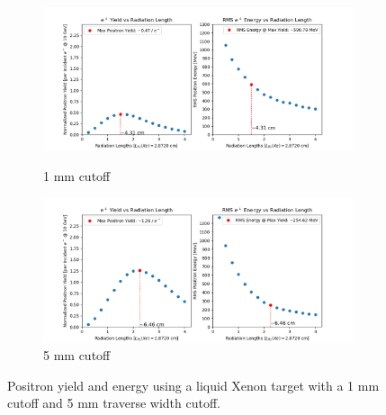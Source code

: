 \documentclass[%
reprint,
amsmath, amssymb,
aps,
floatfix,
]{revtex4-2}
\begin{document}
\begin{figure}[H]
    \begin{subfigure}{.5\textwidth}
        \includegraphics[height = .5\linewidth]{../images/XeYield1mmCutoff.png}
        \caption{\label{fig:XeY1}1 mm cutoff}
        \includegraphics[height = .5\linewidth]{../images/XeYield5mmCutoff.png}
        \caption{\label{fig:XeY5}5 mm cutoff}
    \end{subfigure}
    \caption{\label{fig:YieldCut}Positron yield and energy using 
    a liquid Xenon target with a 1 mm cutoff and 5 mm traverse width cutoff.}
\end{figure}
\end{document}
